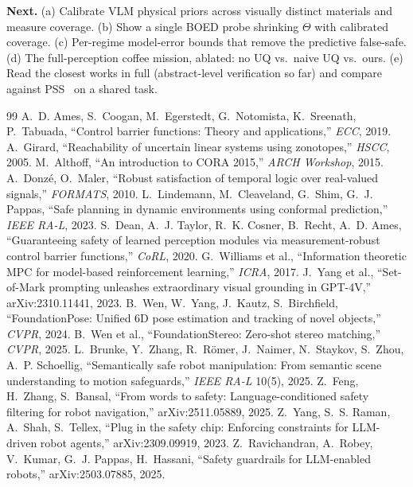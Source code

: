 \documentclass[10pt,twocolumn,letterpaper]{article}
\begin{document}
\textbf{Next.} (a) Calibrate VLM physical priors across visually distinct materials and measure coverage. (b) Show a single BOED probe
shrinking $\Theta$ with calibrated coverage. (c) Per-regime model-error bounds that remove the predictive false-safe. (d) The full-perception
coffee mission, ablated: no UQ vs.\ naive UQ vs.\ ours. (e) Read the closest works in full (abstract-level verification so far) and compare against PSS~\cite{pss} on a shared task.

{\scriptsize
\begin{thebibliography}{99}\setlength{\itemsep}{0pt}\setlength{\parskip}{0pt}
 A.~D. Ames, S.~Coogan, M.~Egerstedt, G.~Notomista, K.~Sreenath, P.~Tabuada, ``Control barrier functions: Theory and applications,'' \emph{ECC}, 2019.
 A.~Girard, ``Reachability of uncertain linear systems using zonotopes,'' \emph{HSCC}, 2005.
 M.~Althoff, ``An introduction to CORA 2015,'' \emph{ARCH Workshop}, 2015.
 A.~Donz\'e, O.~Maler, ``Robust satisfaction of temporal logic over real-valued signals,'' \emph{FORMATS}, 2010.
 L.~Lindemann, M.~Cleaveland, G.~Shim, G.~J. Pappas, ``Safe planning in dynamic environments using conformal prediction,'' \emph{IEEE RA-L}, 2023.
 S.~Dean, A.~J. Taylor, R.~K. Cosner, B.~Recht, A.~D. Ames, ``Guaranteeing safety of learned perception modules via measurement-robust control barrier functions,'' \emph{CoRL}, 2020.
 G.~Williams et al., ``Information theoretic MPC for model-based reinforcement learning,'' \emph{ICRA}, 2017.
 J.~Yang et al., ``Set-of-Mark prompting unleashes extraordinary visual grounding in GPT-4V,'' arXiv:2310.11441, 2023.
 B.~Wen, W.~Yang, J.~Kautz, S.~Birchfield, ``FoundationPose: Unified 6D pose estimation and tracking of novel objects,'' \emph{CVPR}, 2024.
 B.~Wen et al., ``FoundationStereo: Zero-shot stereo matching,'' \emph{CVPR}, 2025.
 L.~Brunke, Y.~Zhang, R.~R\"omer, J.~Naimer, N.~Staykov, S.~Zhou, A.~P. Schoellig, ``Semantically safe robot manipulation: From semantic scene understanding to motion safeguards,'' \emph{IEEE RA-L} 10(5), 2025.
 Z.~Feng, H.~Zhang, S.~Bansal, ``From words to safety: Language-conditioned safety filtering for robot navigation,'' arXiv:2511.05889, 2025.
 Z.~Yang, S.~S. Raman, A.~Shah, S.~Tellex, ``Plug in the safety chip: Enforcing constraints for LLM-driven robot agents,'' arXiv:2309.09919, 2023.
 Z.~Ravichandran, A.~Robey, V.~Kumar, G.~J. Pappas, H.~Hassani, ``Safety guardrails for LLM-enabled robots,'' arXiv:2503.07885, 2025.

\end{thebibliography}}
\end{document}
